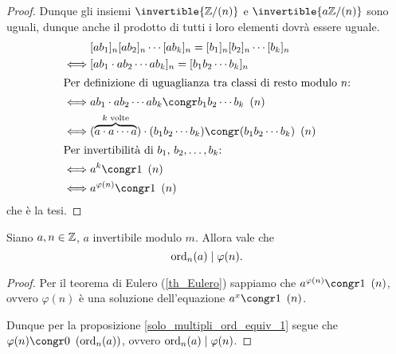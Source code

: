\begin{proof}
    Dunque gli insiemi $\invertible{\Z/(n)}$ e $\invertible{a\Z/(n)}$ sono uguali, dunque anche il prodotto di tutti i loro elementi dovrà essere uguale.
    \begin{alignat*}
        {1}
        &[ab_1]_n[ab_2]_n\cdots [ab_k]_n = [b_1]_n[b_2]_n\cdots [b_k]_n\\
        \iff &[ab_1 \cdot ab_2 \cdots ab_k]_n = [b_1b_2\cdots b_k]_n\\
        \intertext{Per definizione di uguaglianza tra classi di resto modulo $n$:}
        \iff &ab_1 \cdot ab_2 \cdots ab_k \congr b_1b_2\cdots b_k \Mod{n} \\
        \iff &(\overbrace{a\cdot a \cdots a}^{k \text{ volte}}) \cdot (b_1b_2\cdots b_k) \congr (b_1b_2\cdots b_k) \Mod{n}\\
        \intertext{Per invertibilità di $b_1$, $b_2, \dots, b_k$:}
        \iff &a^k \congr 1 \Mod{n}\\
        \iff &a^{\varphi(n)} \congr 1 \Mod{n}
    \end{alignat*}
    che è la tesi.
\end{proof}

\begin{proposition}
    Siano $a, n \in \Z$, $a$ invertibile modulo $m$. Allora vale che \[
        \ord{a}{n} \divides \varphi(n).    
    \]
\end{proposition}
\begin{proof}
    Per il teorema di Eulero (\ref{th_Eulero}) sappiamo che $a^{\varphi(n)} \congr 1 \Mod{n}$, ovvero $\varphi(n)$ è una soluzione dell'equazione $a^x \congr 1 \Mod{n}$. 
    
    Dunque per la proposizione \ref{solo_multipli_ord_equiv_1} segue che $\varphi(n) \congr 0 \Mod{\ord{a}{n}}$, ovvero $\ord{a}{n} \divides \varphi(n)$.
\end{proof}